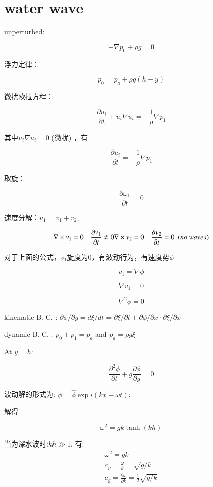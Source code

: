 \documentclass[fontset=windows]{report}
\begin{document}
\section{water wave}

unperturbed:

\[-\nabla p_0+\rho g = 0\]

浮力定律：

\[p_0=p_a+\rho g(h-y)\]

微扰欧拉方程：

\[\frac{\partial u_i}{\partial t}+u_i\nabla u_i = -\frac{1}{\rho}\nabla p_1\]

其中\(u_i\nabla u_i =0\) (微扰) ，有

\[\frac{\partial u_i}{\partial t} = -\frac{1}{\rho}\nabla p_1\]

取旋：

\[\frac{\partial \omega_1}{\partial t} = 0\]

速度分解：\(u_1 = v_1+v_2\),

\[\nabla \times v_1 = 0 \ \ \ \ \frac{\partial v_1}{\partial t}\neq0\\
\nabla \times v_2 = 0 \ \ \ \ \frac{\partial v_2}{\partial t} = 0 \ \ (no\ waves)\]

对于上面的公式，\(v_1\)旋度为0，有波动行为，有速度势\(\phi\)

\[v_1 = \nabla \phi\]

\[\nabla v_1 = 0\]

\[\nabla ^2\phi = 0\]

kinematic B. C. :
\(\partial\phi/\partial y = d\xi/dt=\partial\xi/\partial t+\partial\phi/\partial x\cdot\partial \xi/\partial x\)

dynamic B. C. : \(p_0+p_1=p_a\) and \(p_a = \rho g\xi\)

At \(y = h\):

\[\frac{\partial ^2 \phi}{\partial t}+g\frac{\partial \phi}{\partial y} = 0\]

波动解的形式为: \(\phi = \hat\phi \exp i(kx-\omega t)\):

解得

\[\omega ^2 = gk \tanh (kh)\]

当为深水波时:\(kh\gg1\), 有:
\begin{equation}
  \begin{array}{l}
    \omega ^2=gk\\
    c_p=\frac \omega k=\sqrt{g/k}\\
    c_g=\frac{\partial \omega}{\partial k}=\frac 1 2 \sqrt{g/k}
    \end{array}
\end{equation}
\end{document}
